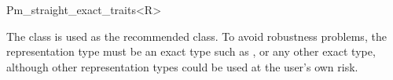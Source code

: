 
\ccRefPageBegin


\begin {ccRefClass} {Pm_straight_exact_traits<R>}
    
    The class 
    is used as the recommended class. To avoid robustness problems, 
    the representation type  must be an exact type such as
    ,
     or any other exact type,
    although other representation types could be used at the user's own risk.

 
\ccIsModel
    \\

    


     
 
\end{ccRefClass} %
\ccRefPageEnd
